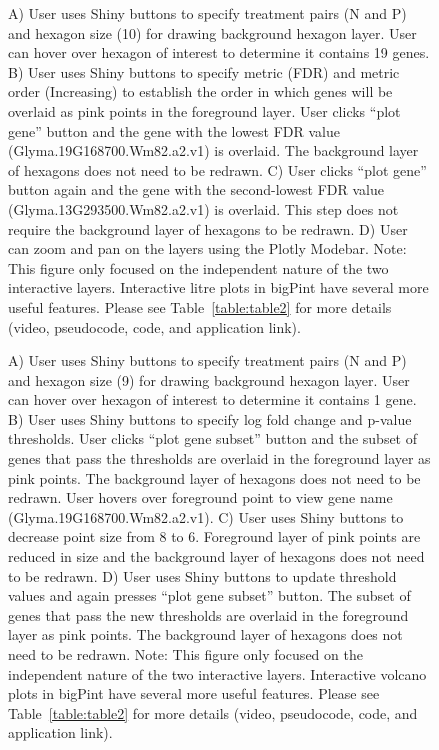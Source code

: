 \documentclass[parskip=full]{bmcart} %
\begin{document}
\begin{backmatter}
\begin{figure}[h!]
\caption{
A) User uses Shiny buttons to specify treatment pairs (N and P) and hexagon size (10) for drawing background hexagon layer. User can hover over hexagon of interest to determine it contains 19 genes. B) User uses Shiny buttons to specify metric (FDR) and metric order (Increasing) to establish the order in which genes will be overlaid as pink points in the foreground layer. User clicks “plot gene” button and the gene with the lowest FDR value (Glyma.19G168700.Wm82.a2.v1) is overlaid. The background layer of hexagons does not need to be redrawn. C) User clicks “plot gene” button again and the gene with the second-lowest FDR value (Glyma.13G293500.Wm82.a2.v1) is overlaid. This step does not require the background layer of hexagons to be redrawn. D) User can zoom and pan on the layers using the Plotly Modebar. Note: This figure only focused on the independent nature of the two interactive layers. Interactive litre plots in bigPint have several more useful features. Please see Table~\ref{table:table2} for more details (video, pseudocode, code, and application link).}
\label{figureLitre}
\end{figure}

\begin{figure}[h!]
\caption{
A) User uses Shiny buttons to specify treatment pairs (N and P) and hexagon size (9) for drawing background hexagon layer. User can hover over hexagon of interest to determine it contains 1 gene. B) User uses Shiny buttons to specify log fold change and p-value thresholds. User clicks “plot gene subset” button and the subset of genes that pass the thresholds are overlaid in the foreground layer as pink points. The background layer of hexagons does not need to be redrawn. User hovers over foreground point to view gene name (Glyma.19G168700.Wm82.a2.v1). C) User uses Shiny buttons to decrease point size from 8 to 6. Foreground layer of pink points are reduced in size and the background layer of hexagons does not need to be redrawn. D) User uses Shiny buttons to update threshold values and again presses “plot gene subset” button. The subset of genes that pass the new thresholds are overlaid in the foreground layer as pink points. The background layer of hexagons does not need to be redrawn. Note: This figure only focused on the independent nature of the two interactive layers. Interactive volcano plots in bigPint have several more useful features. Please see Table~\ref{table:table2} for more details (video, pseudocode, code, and application link).}
\label{figureVolcano}
\end{figure}


\end{backmatter}
\end{document}
